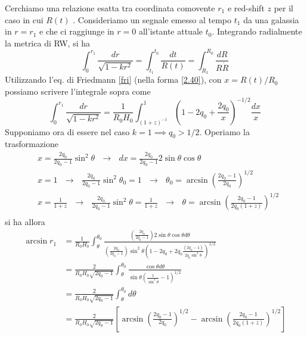 Cerchiamo una relazione esatta tra coordinata comovente $r_1$ e red-shift $z$ per
il caso in cui $R(t)$ .
Consideriamo un segnale emesso al tempo $t_1$ da una galassia in $r=r_1$ e che
ci raggiunge in $r=0$ all'istante attuale $t_0$. Integrando radialmente la
metrica di RW, si ha
\begin{equation}
  \int_0^{r_1} \frac{dr}{\sqrt{1-kr^2}} = \int_{t_1}^{t_0} \frac{dt}{R(t)} =
  \int_{R_1}^{R_0} \frac{dR}{R \dot{R}}
\end{equation}
Utilizzando l'eq. di Friedmann \eqref{fri} (nella forma \eqref{2.40}), con
$x=R(t)/R_0$ possiamo scrivere l'integrale sopra come
\begin{equation}
  \int_0^{r_1} \frac{dr}{\sqrt{1-kr^2}} = \frac{1}{R_0 H_0}
  \int_{(1+z)^{-1}}^{1} \left(1-2q_0+ \frac{2q_0}{x} \right)^{-1/2} \frac{dx}{x}
\end{equation}
Supponiamo ora di essere nel caso $k=1 \implies q_0>1/2$.  Operiamo la trasformazione
\begin{equation}
  \begin{split}
    & x= \frac{2q_0}{2q_0-1} \sin^2 \theta ~~~\rightarrow~~~ dx = \frac{2q_0}{2q_0-1} 2 \sin \theta \cos \theta \\
    & x=1 ~~~\rightarrow~~~ \frac{2q_0}{2q_0-1} \sin^2 \theta_0 =1 ~~~\rightarrow~~~
    \theta_0= \arcsin \left(\frac{2q_0-1}{2q_0}\right)^{1/2} \\
    & x= \frac{1}{1+z} ~~~\rightarrow~~~ \frac{2q_0}{2q_0-1} \sin^2 \theta= \frac{1}{1+z} ~~~\rightarrow~~~
    \theta = \arcsin \left(\frac{2q_0-1}{2q_0(1+z)}\right)^{1/2} \\
  \end{split}
  \label{posizioni_mattig}
\end{equation}
si ha allora
\begin{equation}
  \begin{split}
    \arcsin r_1 & = \frac{1}{R_0 H_0} \int_{\theta}^{\theta_0}
    \frac{ \left(\frac {2q_0}{2q_0-1}\right)  2 \sin \theta \cos \theta d\theta}
    { \left(\frac{2q_0}{2q_0-1}\right) \sin^2 \theta
      \left( 1-2q_0 + 2q_0 \frac{(2q_0-1)}{ 2q_0 \sin^2 \theta} \right)^{1/2}} \\
    & = \frac{2}{R_0 H_0 \sqrt{2q_0-1}}  \int_{\theta}^{\theta_0}
    \frac{\cos \theta d \theta}{\sin \theta \left(\frac{1}{\sin^2 \theta} -1 \right)^{1/2}} \\
    & = \frac{2}{R_0 H_0 \sqrt{2q_0-1}}  \int_{\theta}^{\theta_0} d \theta \\
    & = \frac{2}{R_0 H_0 \sqrt{2q_0-1}}
    \left[ \arcsin \left(\frac{2q_0-1}{2q_0}\right)^{1/2} -
      \arcsin \left(\frac{2q_0-1}{2q_0(1+z)}\right)^{1/2}  \right]
  \end{split}
\end{equation}
